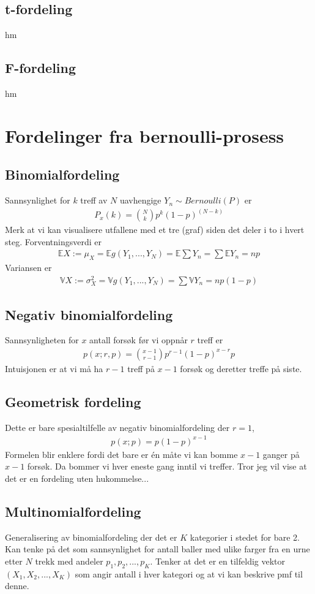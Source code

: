 \subsection{t-fordeling}
hm
\subsection{F-fordeling}
hm
\section{Fordelinger fra bernoulli-prosess}
\subsection{Binomialfordeling}
Sannsynlighet for $k$ treff av $N$ uavhengige $Y_n \sim Bernoulli(P)$ er 
\begin{align}
P_x(k) = \binom{N}{k} p^k(1-p)^{(N-k)}
\end{align}
Merk at vi kan visualisere utfallene med et tre (graf) siden det deler i to i hvert steg. Forventningsverdi er
\begin{align}
\mathbb{E}X := \mu_X= \mathbb{E}g(Y_1,...,Y_N) = \mathbb{E}\sum Y_n = \sum \mathbb{E}Y_n = np
\end{align}
Variansen er 
\begin{align}
\mathbb{V}X := \sigma_X^2 = \mathbb{V}g(Y_1,...,Y_N) = \sum \mathbb{V}Y_n = np(1-p)
\end{align}
\subsection{Negativ binomialfordeling}
Sannsynligheten for $x$ antall forsøk før vi oppnår $r$ treff er
\begin{align}
p(x;r,p)=\binom{x-1}{r-1}p^{r-1}(1-p)^{x-r}p
\end{align}
Intuisjonen er at vi må ha $r-1$ treff på $x-1$ forsøk og deretter treffe på siste. 
\subsection{Geometrisk fordeling}
Dette er bare spesialtilfelle av negativ binomialfordeling der $r=1$,
\begin{align}
p(x;p) = p(1-p)^{x-1}
\end{align}
Formelen blir enklere fordi det bare er én måte vi kan bomme $x-1$ ganger på $x-1$ forsøk. Da bommer vi hver eneste gang inntil vi treffer. Tror jeg vil vise at det er en fordeling uten hukommelse...
\subsection{Multinomialfordeling}
Generalisering av binomialfordeling der det er $K$ kategorier i stedet for bare 2. Kan tenke på det som sannsynlighet for antall baller med ulike farger fra en urne etter $N$ trekk med andeler $p_1,p_2,...,p_K$. Tenker at det er en tilfeldig vektor $(X_1, X_2, ..., X_K)$ som angir antall i hver kategori og at vi kan beskrive pmf til denne. 

